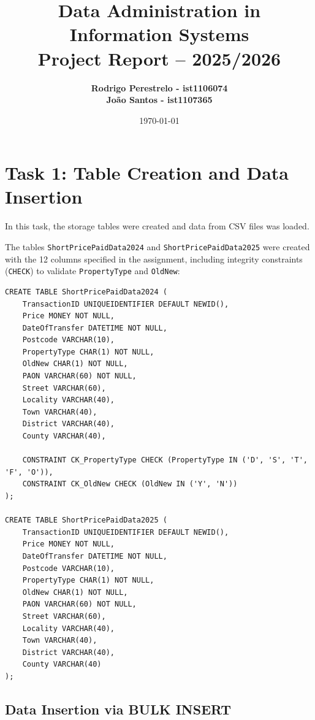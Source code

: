 \documentclass[a4paper,11pt]{article}
\title{
    \vspace{2cm}
    \textbf{\huge Data Administration in Information Systems} \\
    \vspace{1cm}
    \Large Project Report -- 2025/2026 \\
    \vspace{0.5cm}
}
\author{
    \textbf{Rodrigo Perestrelo - ist1106074} \\ \textbf{João Santos - ist1107365}
}
\date{\vfill \today}
\begin{document}
\maketitle
\thispagestyle{empty} %
\newpage

\tableofcontents
\newpage

\setcounter{page}{1}

\section{Task 1: Table Creation and Data Insertion}

In this task, the storage tables were created and data from CSV files was loaded.

The tables \texttt{ShortPricePaidData2024} and \texttt{ShortPricePaidData2025} were created with the 12 columns specified in the assignment, including integrity constraints (\texttt{CHECK}) to validate \texttt{PropertyType} and \texttt{OldNew}:

\begin{lstlisting}[caption=Main tables creation]
CREATE TABLE ShortPricePaidData2024 (
    TransactionID UNIQUEIDENTIFIER DEFAULT NEWID(),
    Price MONEY NOT NULL,
    DateOfTransfer DATETIME NOT NULL, 
    Postcode VARCHAR(10),
    PropertyType CHAR(1) NOT NULL,
    OldNew CHAR(1) NOT NULL,
    PAON VARCHAR(60) NOT NULL,
    Street VARCHAR(60),
    Locality VARCHAR(40),
    Town VARCHAR(40),
    District VARCHAR(40),
    County VARCHAR(40),
    
    CONSTRAINT CK_PropertyType CHECK (PropertyType IN ('D', 'S', 'T', 'F', 'O')),
    CONSTRAINT CK_OldNew CHECK (OldNew IN ('Y', 'N'))
);

CREATE TABLE ShortPricePaidData2025 (
    TransactionID UNIQUEIDENTIFIER DEFAULT NEWID(),
    Price MONEY NOT NULL,
    DateOfTransfer DATETIME NOT NULL, 
    Postcode VARCHAR(10),
    PropertyType CHAR(1) NOT NULL,
    OldNew CHAR(1) NOT NULL,
    PAON VARCHAR(60) NOT NULL,
    Street VARCHAR(60),
    Locality VARCHAR(40),
    Town VARCHAR(40),
    District VARCHAR(40),
    County VARCHAR(40)
);
\end{lstlisting}

\subsection{Data Insertion via BULK INSERT}
\end{document}
